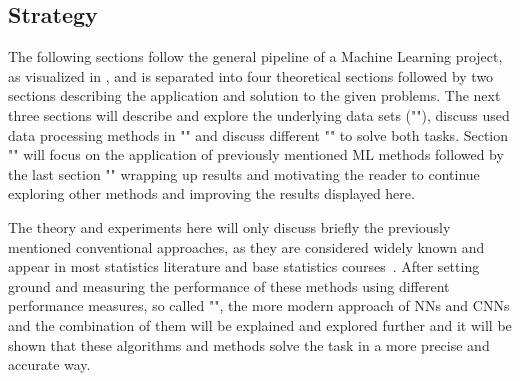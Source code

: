 \subsection{Strategy}\label{subsec:strategy}
The following sections follow the general pipeline of a Machine Learning project, as visualized in , and is separated into four theoretical sections followed by two sections describing the application and solution to the given problems.
The next three sections will describe and explore the underlying data sets (""), discuss used data processing methods in  "" and discuss different "" to solve both tasks.
Section "" will focus on the application of previously mentioned ML methods followed by the last section "" wrapping up results and motivating the reader to continue exploring other methods and improving the results displayed here.

The theory and experiments here will only discuss briefly the previously mentioned conventional approaches, as they are considered widely known and appear in most statistics literature and base statistics courses~\cite{LinReg1, LinReg2, handsOn}.
After setting ground and measuring the performance of these methods using different performance measures, so called "", the more modern approach of NNs and CNNs and the combination of them will be explained and explored further and it will be shown that these algorithms and methods solve the task in a more precise and accurate way.
